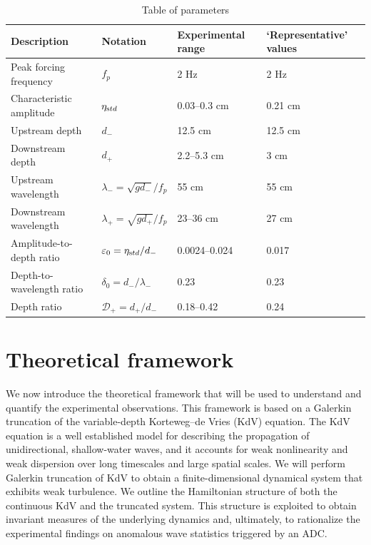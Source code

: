 \documentclass[11pt]{article}
\newcommand{\eps}{\varepsilon}
\newcommand{\etastd}{\eta_{\text std}}
\newcommand{\depth}{d}
\newcommand{\dup}{\depth_{-}}
\newcommand{\ddn}{\depth_{+}}
\newcommand{\lam}{\lambda}
\newcommand{\lamup}{\lam_{-}}
\newcommand{\lamdn}{\lam_{+}}
\newcommand{\drat}{\mathcal{D}}
\newcommand{\dratdn}{\drat_+}
\newcommand{\epsup}{\eps_0}
\newcommand{\delup}{\delta_0}
\begin{document}
\begin{table}[h]%
\begin{center}
\caption{Table of parameters}
\label{paramtable}
\begin{tabular}{l l l l}
\hline Description & Notation & Experimental range & `Representative' values \\
\hline
Peak forcing frequency	& $f_p$					& 2 Hz 		& 2 Hz \\
Characteristic amplitude	& $\etastd$				& 0.03--0.3 cm	& 0.21 cm \\
Upstream depth		& $\dup$					& 12.5 cm 	& 12.5 cm \\
Downstream depth		& $\ddn$					& 2.2--5.3 cm	& 3 cm \\
Upstream wavelength	& $\lamup = \sqrt{g \dup}/f_p$	& 55 cm 		& 55 cm \\
Downstream wavelength	& $\lamdn = \sqrt{g \ddn}/f_p$	& 23--36 cm	& 27 cm \\
%
Amplitude-to-depth ratio	& $\epsup = \etastd / \dup$	&0.0024--0.024	& 0.017 \\
Depth-to-wavelength ratio	& $\delup = \dup / \lamup$	& 0.23		& 0.23 \\
Depth ratio			& $\dratdn = \ddn/\dup$		& 0.18--0.42	& 0.24
\end{tabular}
\end{center}
\end{table}


\section{Theoretical framework}
\label{theory}

We now introduce the theoretical framework that will be used to understand and quantify the experimental observations. This framework is based on a Galerkin truncation of the variable-depth Korteweg–de Vries (KdV) equation. The KdV equation is a well established model for describing the propagation of unidirectional, shallow-water waves, and it accounts for weak nonlinearity and weak dispersion over long timescales and large spatial scales. We will perform Galerkin truncation of KdV to obtain a finite-dimensional dynamical system that exhibits weak turbulence. We outline the Hamiltonian structure of both the continuous KdV and the truncated system. This structure is exploited to obtain invariant measures of the underlying dynamics and, ultimately, to rationalize the experimental findings on anomalous wave statistics triggered by an ADC.
\end{document}
